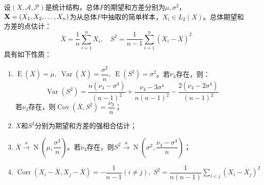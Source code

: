 \begin{property}\label{prop:EVPE}
	设$(X,\mathscr{A},\mathscr{P})$是统计结构，总体$F$的期望和方差分别为$\mu,\sigma^2$，$\mathbf{X}=(X_1, X_2, \dots, X_{n})$为从总体$F$中抽取的简单样本，$X_i\in L_2(X)$。总体期望和方差的点估计：
	\begin{equation*}
		\overline{X}=\frac{1}{n}\sum_{i=1}^{n}X_i,\quad S^2=\frac{1}{n-1}\sum_{i=1}^{n}(X_i-\overline{X})^2
	\end{equation*}
	具有如下性质：
	\begin{enumerate}
		\item $\operatorname{E}(\overline{X})=\mu,\;\operatorname{Var}(\overline{X})=\dfrac{\sigma^2}{n},\;\operatorname{E}(S^2)=\sigma^2$。若$\nu_4$存在，则：
		\begin{equation*}
			\operatorname{Var}(S^2)=\frac{n(\nu_4-\sigma^4)}{(n-1)^2}+\frac{\nu_4-3\sigma^4}{n(n-1)^2}-\frac{2(\nu_4-2\sigma^4)}{(n-1)^2}
		\end{equation*}
		若$\nu_3$存在，则$\operatorname{Cov}(\overline{X},S^2)=\dfrac{\nu_3}{n}$；
		\item $\overline{X}$和$S^2$分别为期望和方差的强相合估计；
		\item $\overline{X}\overset{a}{\longrightarrow}\operatorname{N}\left(\mu,\dfrac{\sigma^2}{n}\right)$。若$\nu_4$存在，则$S^2\overset{a}{\longrightarrow}\operatorname{N}\left(\sigma^2,\dfrac{\nu_4-\sigma^4}{n}\right)$；
		\item $\operatorname{Corr}(X_i-\overline{X},X_j-\overline{X})=-\dfrac{1}{n-1}(i\ne j),\;S^2=\dfrac{1}{n(n-1)}\sum\limits_{i<j}(X_i-X_j)^2$
	\end{enumerate}
\end{property}
